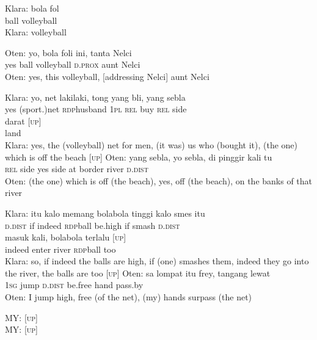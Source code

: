 \ea
\gll   Klara:   bola   fol\\
 {}    ball   volleyball\\
\glt
Klara: volleyball
\z

\ea
\gll   Oten:   yo,   bola   foli   ini,   tanta   Nelci\\
{}     yes   ball   volleyball   \textsc{d.prox}   aunt   Nelci\\
\glt
Oten: yes, this volleyball, [addressing Nelci] aunt Nelci
\z

\ea
\gll   Klara:   yo,   net   laki{\Tilde}laki,   tong   yang   bli,   yang   sebla\\
    {} yes   (sport.)net   \textsc{rdp}{\Tilde}husband   \textsc{1pl}   \textsc{rel}   buy   \textsc{rel}   side\\
\gll  darat   \textup{[\textsc{up}]}\\
  land    {}\\
\glt
Klara: yes, the (volleyball) net for men, (it was) us who (bought it), (the one) which is off the beach [\textsc{up}]
\z
\ea
\gll   Oten:   yang   sebla,   yo   sebla,   di   pinggir   kali   tu\\
{}     \textsc{rel}   side   yes   side   at   border   river   \textsc{d.dist}\\
\glt
Oten: (the one) which is off (the beach), yes, off (the beach), on the banks of that river
\z

\ea
\gll   Klara:    {itu}    {kalo}    {memang}    {bola{\Tilde}bola}    {tinggi}   kalo   smes   itu\\
 {}     {\textsc{d.dist}}    {if}    {indeed}    {\textsc{rdp}{\Tilde}ball}    {be.high}   if   smash   \textsc{d.dist}\\
    {masuk}    {kali,}    {bola{\Tilde}bola}    {terlalu}    \textup{[\textsc{up}]}\\
   {indeed}    {enter}    {river}    {\textsc{rdp}{\Tilde}ball}    {too}    {}\\
\glt
Klara: so, if indeed the balls are high, if (one) smashes them, indeed they go into the river, the balls are too [\textsc{up}]
\z
\ea
\gll   Oten:   sa   lompat   itu   frey,   tangang   lewat\\
 {}    \textsc{1sg}   jump   \textsc{d.dist}   be.free   hand   pass.by\\
\glt
Oten: I jump high, free (of the net), (my) hands surpass (the net)
\z

\ea
\gll   MY:   {\upshape\textsc{[up]}}\\
MY: [\textsc{up}]\\
\z

